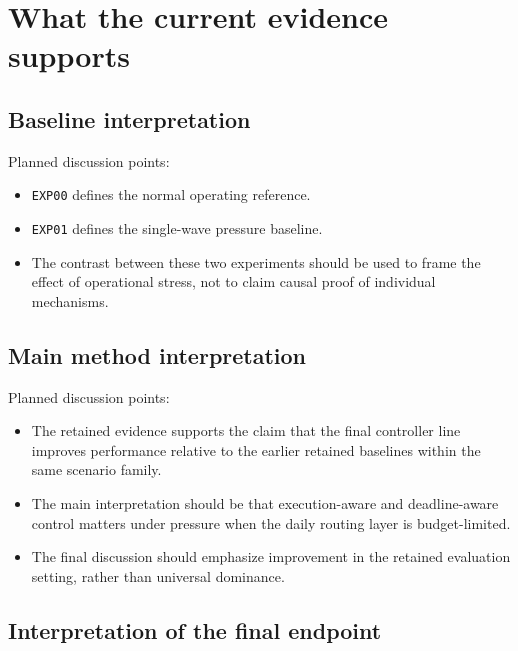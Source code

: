 \section{What the current evidence supports}

\subsection{Baseline interpretation}

Planned discussion points:
\begin{itemize}
    \item \texttt{EXP00} defines the normal operating reference.
    \item \texttt{EXP01} defines the single-wave pressure baseline.
    \item The contrast between these two experiments should be used to frame the effect of operational stress, not to claim causal proof of individual mechanisms.
\end{itemize}

\subsection{Main method interpretation}

Planned discussion points:
\begin{itemize}
    \item The retained evidence supports the claim that the final controller line improves performance relative to the earlier retained baselines within the same scenario family.
    \item The main interpretation should be that execution-aware and deadline-aware control matters under pressure when the daily routing layer is budget-limited.
    \item The final discussion should emphasize improvement in the retained evaluation setting, rather than universal dominance.
\end{itemize}

\subsection{Interpretation of the final endpoint}

